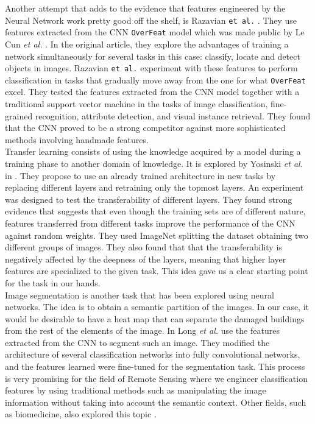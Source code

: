 Another attempt that adds to the evidence that features engineered by the Neural Network work pretty good off the shelf, is Razavian \texttt{et al.} \cite{DBLP:journals/corr/RazavianASC14}. They use features extracted from the CNN \texttt{OverFeat} model which was made public by Le Cun \textit{et al.} \cite{DBLP:journals/corr/SermanetEZMFL13}. In the original article, they explore the advantages of training a network simultaneously for several tasks in this case: classify, locate and detect objects in images. Razavian \texttt{et al.} experiment with these features to perform classification in tasks that gradually move away from the one for what \texttt{OverFeat} excel. They tested the features extracted from the CNN model together with a traditional support vector machine in the tasks of image classification, fine-grained recognition, attribute detection, and visual instance retrieval. They found that the CNN proved to be a strong competitor against more sophisticated methods involving handmade features.\\

Transfer learning consists of using the knowledge acquired by a model during a training phase to another domain of knowledge. It is explored by Yosinski \textit{et al.} in \cite{DBLP:journals/corr/YosinskiCBL14}. They propose to use an already trained architecture in new tasks by replacing different layers and retraining only the topmost layers. An experiment was designed to test the transferability of different layers. They found strong evidence that suggests that even though the training sets are of different nature, features transferred from different tasks improve the performance of the CNN against random weights. They used ImageNet \cite{Deng09imagenet:a} splitting the dataset obtaining two different groups of images. They also found that that the transferability is negatively affected by the deepness of the layers, meaning that higher layer features are specialized to the given task. This idea gave us a clear starting point for the task in our hands.\\

Image segmentation is another task that has been explored using neural networks. The idea is to obtain a semantic partition of the images. In our case, it would be desirable to have a heat map that can separate the damaged buildings from the rest of the elements of the image. In \cite{DBLP:journals/corr/LongSD14} Long \textit{et al.} use the features extracted from the CNN to segment such an image. They modified the architecture of several classification networks into fully convolutional networks, and the features learned were fine-tuned for the segmentation task. This process is very promising for the field of Remote Sensing where we engineer classification features by using traditional methods such as manipulating the image information without taking into account the semantic context. Other fields, such as biomedicine, also explored this topic \cite{DBLP:journals/corr/RonnebergerFB15}.\\

